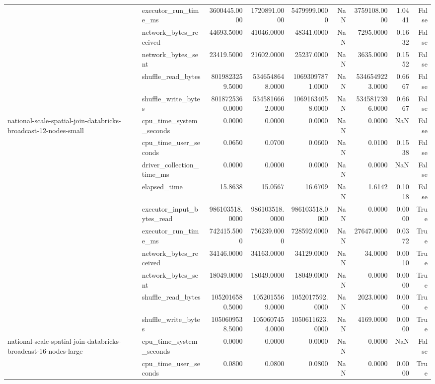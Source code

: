 \begin{tabular}{llrrrrrrr}
 & executor\_run\_time\_ms & 3600445.0000 & 1720891.0000 & 5479999.0000 & NaN & 3759108.0000 & 1.0441 & False \\
 & network\_bytes\_received & 44693.5000 & 41046.0000 & 48341.0000 & NaN & 7295.0000 & 0.1632 & False \\
 & network\_bytes\_sent & 23419.5000 & 21602.0000 & 25237.0000 & NaN & 3635.0000 & 0.1552 & False \\
 & shuffle\_read\_bytes & 8019823259.5000 & 5346548648.0000 & 10693097871.0000 & NaN & 5346549223.0000 & 0.6667 & False \\
 & shuffle\_write\_bytes & 8018725360.0000 & 5345816662.0000 & 10691634058.0000 & NaN & 5345817396.0000 & 0.6667 & False \\
\cline{1-9}
\multirow[t]{10}{*}{national-scale-spatial-join-databricks-broadcast-12-nodes-small} & cpu\_time\_system\_seconds & 0.0000 & 0.0000 & 0.0000 & NaN & 0.0000 & NaN & False \\
 & cpu\_time\_user\_seconds & 0.0650 & 0.0700 & 0.0600 & NaN & 0.0100 & 0.1538 & False \\
 & driver\_collection\_time\_ms & 0.0000 & 0.0000 & 0.0000 & NaN & 0.0000 & NaN & False \\
 & elapsed\_time & 15.8638 & 15.0567 & 16.6709 & NaN & 1.6142 & 0.1018 & False \\
 & executor\_input\_bytes\_read & 986103518.0000 & 986103518.0000 & 986103518.0000 & NaN & 0.0000 & 0.0000 & True \\
 & executor\_run\_time\_ms & 742415.5000 & 756239.0000 & 728592.0000 & NaN & 27647.0000 & 0.0372 & True \\
 & network\_bytes\_received & 34146.0000 & 34163.0000 & 34129.0000 & NaN & 34.0000 & 0.0010 & True \\
 & network\_bytes\_sent & 18049.0000 & 18049.0000 & 18049.0000 & NaN & 0.0000 & 0.0000 & True \\
 & shuffle\_read\_bytes & 1052016580.5000 & 1052015569.0000 & 1052017592.0000 & NaN & 2023.0000 & 0.0000 & True \\
 & shuffle\_write\_bytes & 1050609538.5000 & 1050607454.0000 & 1050611623.0000 & NaN & 4169.0000 & 0.0000 & True \\
\cline{1-9}
\multirow[t]{10}{*}{national-scale-spatial-join-databricks-broadcast-16-nodes-large} & cpu\_time\_system\_seconds & 0.0000 & 0.0000 & 0.0000 & NaN & 0.0000 & NaN & False \\
 & cpu\_time\_user\_seconds & 0.0800 & 0.0800 & 0.0800 & NaN & 0.0000 & 0.0000 & True \\

\end{tabular}
